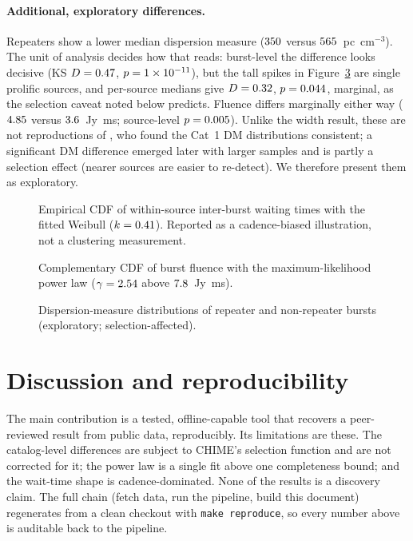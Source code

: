 \documentclass[twocolumn]{aastex631}
\newcommand{\code}[1]{\texttt{#1}}
\begin{document}
\paragraph{Additional, exploratory differences.} Repeaters show a lower median dispersion
measure ($350$ versus $565$~pc~cm$^{-3}$). The unit of analysis decides how
that reads: burst-level the difference looks decisive (KS $D=0.47$, $p=1\times10^{-11}$), but
the tall spikes in Figure~\ref{fig:dm} are single prolific sources, and per-source
medians give $D=0.32$, $p=0.044$, marginal, as the selection
caveat noted below predicts. Fluence differs marginally either way
($4.85$ versus $3.6$~Jy~ms; source-level $p=0.005$).
Unlike the width result, these are not reproductions of \citet{pleunis2021}, who found
the Cat~1 DM distributions consistent; a significant DM difference emerged later with
larger samples \citep{chime25repeaters} and is partly a selection effect (nearer sources
are easier to re-detect). We therefore present them as exploratory.

\begin{figure}
\caption{Empirical CDF of within-source inter-burst waiting times with the fitted Weibull
($k=0.41$). Reported as a cadence-biased illustration, not a clustering measurement.}
\label{fig:wait}
\end{figure}

\begin{figure}
\caption{Complementary CDF of burst fluence with the maximum-likelihood power law
($\gamma=2.54$ above $7.8$~Jy~ms).}
\label{fig:fluence}
\end{figure}

\begin{figure}
\caption{Dispersion-measure distributions of repeater and non-repeater bursts
(exploratory; selection-affected).}
\label{fig:dm}
\end{figure}

\section{Discussion and reproducibility}
The main contribution is a tested, offline-capable tool that recovers a peer-reviewed
result from public data, reproducibly. Its limitations are these. The catalog-level
differences are subject to
CHIME's selection function and are not corrected for it; the power law is a single fit
above one completeness bound; and the wait-time shape is cadence-dominated. None of the
results is a discovery claim. The full chain (fetch data, run the pipeline, build this
document) regenerates from a clean checkout with \code{make reproduce}, so every number
above is auditable back to the pipeline.
\end{document}
